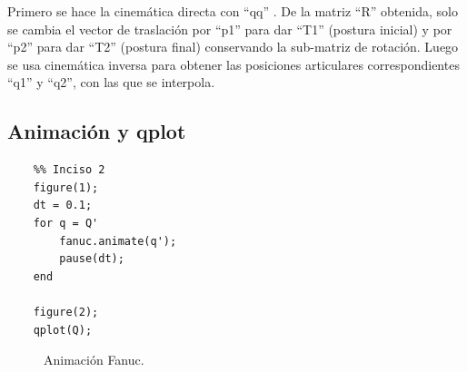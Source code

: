 \documentclass[a4paper,12pt]{article}
\begin{document}
Primero se hace la cinemática directa con ``qq'' . De la matriz ``R'' obtenida,
solo se cambia el vector de traslación por ``p1'' para dar ``T1'' (postura inicial) y por ``p2'' para dar ``T2'' (postura final)
conservando la sub-matriz de rotación.
Luego se usa cinemática inversa para obtener las posiciones articulares correspondientes ``q1'' y ``q2'', con las que se interpola.

\subsection{Animación y qplot}
\begin{lstlisting}
    %% Inciso 2
    figure(1);
    dt = 0.1;
    for q = Q'
        fanuc.animate(q');
        pause(dt);
    end

    figure(2);
    qplot(Q);
\end{lstlisting}

\begin{figure}[H]
    \centering
    \begin{adjustbox}{scale = 0.65, max width=\columnwidth}
    \end{adjustbox}
    \caption{Animación Fanuc.}
\end{figure}
\end{document}
